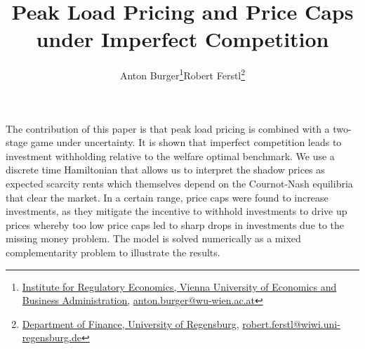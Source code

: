 \documentclass[a4paper,11pt]{scrartcl}
\title{Peak Load Pricing and Price Caps under Imperfect Competition}
\date{ }
\author{Anton Burger\thanks{\href{http://www.wu-wien.ac.at/regulierung}{Institute for Regulatory Economics, Vienna University of Economics and Business Administration,} \href{mailto:anton.burger@wu-wien.ac.at}{anton.burger@wu-wien.ac.at}}\hspace{1cm}Robert Ferstl\thanks{\href{http://www-finanzierung.uni-regensburg.de/}{Department of Finance, University of Regensburg,} \href{mailto:robert.ferstl@wiwi.uni-regensburg.de}{robert.ferstl@wiwi.uni-regensburg.de}}}
\begin{document}
\maketitle 

The contribution of this paper is that peak load pricing is combined with a two-stage game under uncertainty. It is shown that imperfect competition leads to investment withholding relative to the welfare optimal benchmark. We use a discrete time Hamiltonian that allows us to interpret the shadow prices as expected scarcity rents which themselves depend on the Cournot-Nash equilibria that clear the market. In a certain range, price caps were found to increase investments, as they mitigate the incentive to withhold investments to drive up prices whereby too low price caps led to sharp drops in investments due to the missing money problem. The model is solved numerically as a mixed complementarity problem to illustrate the results.


%
%
\end{document}

